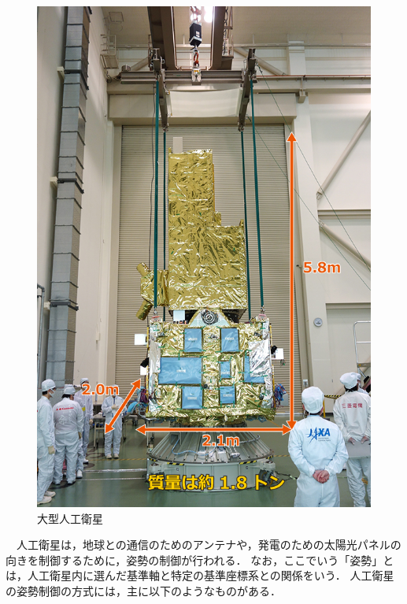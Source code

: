 \begin{figure}[H]
\begin{minipage}[b]{0.51\columnwidth}
        \includegraphics[width=0.9\columnwidth]{./figure/大型.jpg}
        \caption{大型人工衛星}
        \label{fig:c}
    \end{minipage}
\end{figure}
    


　人工衛星は，地球との通信のためのアンテナや，発電のための太陽光パネルの向きを制御するために，姿勢の制御が行われる．
なお，ここでいう「姿勢」とは，人工衛星内に選んだ基準軸と特定の基準座標系との関係をいう\cite{intro3}．
人工衛星の姿勢制御の方式には，主に以下のようなものがある．

